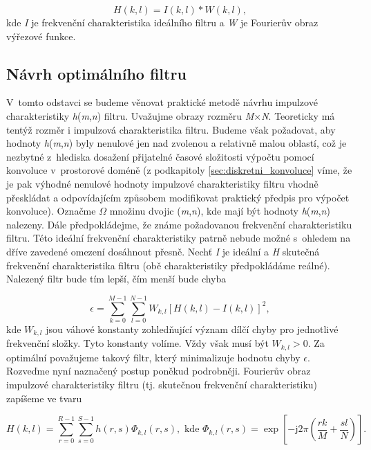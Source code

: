\begin{equation} \label{eq:5_16}
    H(k, l) = I(k, l) * W(k, l),
\end{equation}
kde \textit{I} je frekvenční charakteristika ideálního filtru a \textit{W} je Fourierův obraz výřezové funkce.

\subsection*{Návrh optimálního filtru}

V~tomto odstavci se budeme věnovat praktické metodě návrhu impulzové charakteristiky \textit{h}(\textit{m},\textit{n}) filtru. Uvažujme obrazy rozměru \textit{M}$\times$\textit{N}. Teoreticky má tentýž rozměr i impulzová charakteristika filtru. Budeme však požadovat, aby hodnoty \textit{h}(\textit{m},\textit{n}) byly nenulové jen nad zvolenou a relativně malou oblastí, což je nezbytné z~hlediska dosažení přijatelné časové složitosti výpočtu pomocí konvoluce v~prostorové doméně (z podkapitoly \ref{sec:diskretni_konvoluce} víme, že je pak výhodné nenulové hodnoty impulzové charakteristiky filtru vhodně přeskládat a odpovídajícím způsobem modifikovat praktický předpis pro výpočet konvoluce). Označme $\Omega$ množinu dvojic (\textit{m},\textit{n}), kde mají být hodnoty \textit{h}(\textit{m},\textit{n}) nalezeny. Dále předpokládejme, že známe požadovanou frekvenční charakteristiku filtru. Této ideální frekvenční charakteristiky patrně nebude možné s~ohledem na dříve zavedené omezení dosáhnout přesně. Nechť \textit{I} je ideální a \textit{H} skutečná frekvenční charakteristika filtru (obě charakteristiky předpokládáme reálné). Nalezený filtr bude tím lepší, čím menší bude chyba

\begin{equation} \label{eq:5_17}
    \epsilon = \sum\limits_{k=0}^{M-1} \sum\limits_{l=0}^{N-1} W_{k, l} \left[ H(k, l) - I(k, l) \right]^2,
\end{equation}
kde $W_{k, l}$ jsou váhové konstanty zohledňující význam dílčí chyby pro jednotlivé frekvenční složky. Tyto konstanty volíme. Vždy však musí být $W_{k, l} > 0$. Za optimální považujeme takový filtr, který minimalizuje hodnotu chyby $\epsilon$. Rozveďme nyní naznačený postup poněkud podrobněji. Fourierův obraz impulzové charakteristiky filtru (tj. skutečnou frekvenční charakteristiku) zapíšeme ve tvaru

\begin{equation} \label{eq:5_18-19}
    H(k, l) = \sum\limits_{r=0}^{R-1} \sum\limits_{s=0}^{S-1} h(r, s) \Phi_{k, l} (r, s), \,\, \mathrm{kde} \,\, \Phi_{k, l} (r, s) = \exp \left[ - \mathrm{j} 2 \pi \left( \frac{rk}{M} + \frac{sl}{N} \right) \right].
\end{equation}

